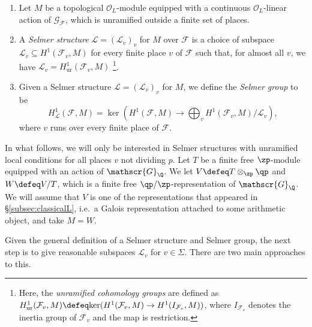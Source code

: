 \documentclass[a4paper,10pt, english, reqno]{smfart}
\newcommand{\cF}{\mathcal{F}}
\numberwithin{equation}{section}
\begin{document}
\begin{definition}
 \begin{enumerate}
 \item Let $M$ be a topological $\mathcal{O}_L$-module equipped with a continuous $\mathcal{O}_L$-linear action of $\mathscr{G}_{\cF}$, which is unramified outside a finite set of places. 
 \item A \emph{Selmer structure} $\mathcal{L} = (\mathcal{L}_v)_v$ for $M$ over $\cF$ is a choice of subspace $\mathcal{L}_v \subseteq H^1(\cF_v, M)$ for every finite place $v$ of $\cF$ such that, for almost all $v$, we have $\mathcal{L}_v = H^1_{\mathrm{ur}}(\cF_v, M)$ \footnote{Here, the \emph{unramified cohomology groups} are defined as $H^1_{\mathrm{ur}}(\cF_v, M) \defeq \mathrm{ker}(H^1(\cF_v ,M) \to H^1(I_{\cF_v}, M))$, where $I_{\cF_v}$ denotes the inertia group of $\cF_v$ and the map is restriction.}. 
 \item Given a Selmer structure $\mathcal{L} = (\mathcal{L}_v)_v$ for $M$, we define the \emph{Selmer group} to be
\[ H^1_\mathcal{L}(\cF, M) = \ker \left( H^1(\cF,M) \to \bigoplus_v H^1(\cF_v, M) / \mathcal{L}_v \right), \]
where $v$ runs over every finite place of $\cF$.
\end{enumerate}
\end{definition}


In what follows, we will only be interested in Selmer structures with unramified local conditions for all places $v$ not dividing $p$. Let $T$ be a finite free $\zp$-module equipped with an action of $\mathscr{G}_{\Q}$. We let $V \defeq T \otimes_{\zp} \qp$ and $W \defeq V / T$, which is a finite free $\qp / \zp$-representation of $\mathscr{G}_\Q$. We will assume that $V$ is one of the representations that appeared in \S \ref{subsec:classicalL}, i.e.\ a Galois representation attached to some arithmetic object, and take $M = W$.

Given the general definition of a Selmer structure and Selmer group, the next step is to give reasonable subspaces $\mathcal{L}_v$ for $v \in \Sigma$. There are two main approaches to this.
\end{document}
